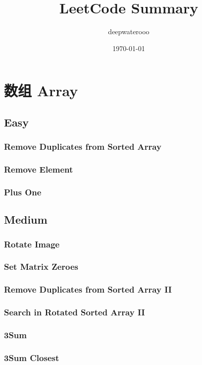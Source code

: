 \documentclass[12pt]{book}
\author{deepwaterooo}
\date{\today}
\title{LeetCode Summary}
\begin{document}
\maketitle
\tableofcontents


\chapter{数组 Array}
\label{sec-1}
\section{Easy}
\label{sec-1-1}
\subsection{Remove Duplicates from Sorted Array}
\label{sec-1-1-1}
\subsection{Remove Element}
\label{sec-1-1-2}
\subsection{Plus One}
\label{sec-1-1-3}
\section{Medium}
\label{sec-1-2}
\subsection{Rotate Image}
\label{sec-1-2-1}
\subsection{Set Matrix Zeroes}
\label{sec-1-2-2}
\subsection{Remove Duplicates from Sorted Array II}
\label{sec-1-2-3}
\subsection{Search in Rotated Sorted Array II}
\label{sec-1-2-4}
\subsection{3Sum}
\label{sec-1-2-5}
\subsection{3Sum Closest}
\label{sec-1-2-6}
\end{document}
